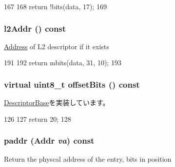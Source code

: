\begin{DoxyCode}
167         {
168             return !bits(data, 17);
169         }
\end{DoxyCode}
\hypertarget{classArmISA_1_1TableWalker_1_1L1Descriptor_ad41ce35ecb10e8814bcc8829ad89a508}{
\subsubsection[{l2Addr}]{ l2Addr () const}}
\label{classArmISA_1_1TableWalker_1_1L1Descriptor_ad41ce35ecb10e8814bcc8829ad89a508}
\hyperlink{classAddress}{Address} of L2 descriptor if it exists 


\begin{DoxyCode}
191         {
192             return mbits(data, 31, 10);
193         }
\end{DoxyCode}
\hypertarget{classArmISA_1_1TableWalker_1_1L1Descriptor_ad075c68f96598f36f78db5fbfc3ed339}{
\subsubsection[{offsetBits}]{\setlength{\rightskip}{0pt plus 5cm}virtual uint8\_\-t offsetBits () const}}
\label{classArmISA_1_1TableWalker_1_1L1Descriptor_ad075c68f96598f36f78db5fbfc3ed339}


\hyperlink{classArmISA_1_1TableWalker_1_1DescriptorBase_a21735b91214af921462c578b766a01ae}{DescriptorBase}を実装しています。


\begin{DoxyCode}
126         {
127             return 20;
128         }
\end{DoxyCode}
\hypertarget{classArmISA_1_1TableWalker_1_1L1Descriptor_a4fd8dbd54f4412ba92edbf632940c8de}{
\subsubsection[{paddr}]{ paddr ({\bf Addr} {\em va}) const}}
\label{classArmISA_1_1TableWalker_1_1L1Descriptor_a4fd8dbd54f4412ba92edbf632940c8de}
Return the physcal address of the entry, bits in position 


